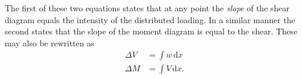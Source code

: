 The first of these two equations states that at any point the \textit{slope} of the shear diagram equals the intensity of the distributed loading.
In a similar manner the second states that the slope of the moment diagram is equal to the shear.
These may also be rewritten as
\begin{align*}
  \Delta V &= \int  w \, \mathrm{d}x  \\
  \Delta M &= \int  V \, \mathrm{d}x 
.\end{align*}

